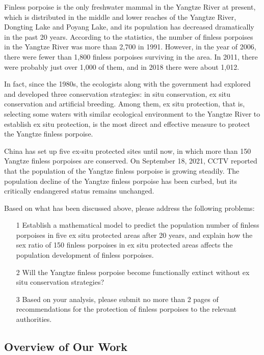 \documentclass{mcmthesis}
\numberwithin{figure}{section}
\numberwithin{table}{section}
\numberwithin{equation}{section}
\begin{document}
Finless porpoise is the only freshwater mammal in the Yangtze River at present, 
which is distributed in the middle and lower reaches of the Yangtze 
River, Dongting Lake and Poyang Lake, and its population has 
decreased dramatically in the past 20 years. According to the statistics, 
the number of finless porpoises in the Yangtze River was more than 2,700 in 1991. 
However, in the year of 2006, there were fewer than 1,800 finless porpoises surviving in the area. 
In 2011, there were probably just over 1,000 of them, and in 2018 there were about 1,012. 
\par
In fact, since the 1980s, the ecologists along with the government
had explored and developed three conservation strategies: 
in situ conservation, ex situ conservation and artificial breeding.
Among them, ex situ protection, that is, selecting some waters with 
similar ecological environment to the Yangtze River to establish 
ex situ protection, is the most direct and effective measure
to protect the Yangtze finless porpoise. 
\par
China has set up five ex-situ protected sites until now, in which 
more than 150 Yangtze finless porpoises are conserved. On September 18, 2021, CCTV reported that 
the population of the Yangtze finless porpoise is growing steadily. 
The population decline of the Yangtze finless porpoise has been 
curbed, but its critically endangered status remains unchanged.
\par
Based on what has been discussed above, please address the following problems:
\begin{enumerate}
  \item [1] Establish a mathematical model to predict the population number of finless porpoises in five ex situ protected areas after 20 years, and explain how the sex ratio of 150 finless porpoises in ex situ protected areas affects the population development of finless porpoises.
  \item [2] Will the Yangtze finless porpoise become functionally extinct without ex situ conservation strategies?
  \item [3] Based on your analysis, please submit no more than 2 pages of recommendations for the protection of finless porpoises to the relevant authorities.
\end{enumerate}

\subsection{Overview of Our Work}
\end{document}
